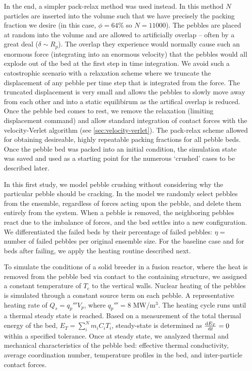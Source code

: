 In the end, a simpler pack-relax method was used instead. In this method $N$ particles are inserted into the volume such that we have precisely the packing fraction we desire (in this case, $\phi = 64\%$ so $N = 11000$). The pebbles are placed at random into the volume and are allowed to artificially overlap -- often by a great deal ($\delta \sim R_p$). The overlap they experience would normally cause such an enormous force (integrating into an enormous velocity) that the pebbles would all explode out of the bed at the first step in time integration. We avoid such a catostrophic scenario with a relaxation scheme where we truncate the displacement of any pebble per time step that is integrated from the force. The truncated displacement is very small and allows the pebbles to slowly move away from each other and into a static equilibirum as the artifical overlap is reduced. Once the pebble bed comes to rest, we remove the relaxation (limiting displacement command) and allow standard integration of contact forces with the velocity-Verlet algorithm (see \cref{sec:velocity-verlet}). The pack-relax scheme allowed for obtaining desireable, highly repeatable packing fractions for all pebble beds. Once the pebble bed was packed into an initial condition, the simulation state was saved and used as a starting point for the numerous `crushed' cases to be described later.

In this first study, we model pebble crushing without considering why the particular pebble should be cracking. In the model we randomly select pebbles from the ensemble, regardless of forces acting upon the pebble, and delete them entirely from the system. When a pebble is removed, the neighboring pebbles react due to the imbalance of forces, and the bed settles into a new configuration. We differentiated the failed beds by their percentage of failed pebbles: $\eta = $ number of failed pebbles per original ensemble size. For the baseline case and for beds after failing, we apply the heating routine described next.

To simulate the conditions of a solid breeder in a fusion reactor, where the heat is removed from the pebble bed via contact to the containing structure, we assigned a constant temperature of $T_\text{c}$ to the vertical walls. Nuclear heating of the pebbles is simulated through a constant source term on each pebble. A representative heating rate of $Q_s = q_p'''V_p$, where  $q_p'''= 8$ MW/m$^3$. The heating cycle runs until a thermal steady state is reached. Based on a measurement of the total thermal energy of the bed, $E_T =\sum_i^N m_iC_i T_i$, steady-state is determined as $\frac{\mathrm{d}{E_T}}{\mathrm{d}t} = 0$ within a specified tolerance. Once at steady state, we analyzed thermal and mechanical characteristics of the pebble bed: effective thermal conductivity, average coordination number, temperature profiles in the bed, and inter-particle contact forces. 

